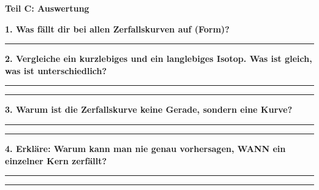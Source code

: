 \documentclass[10pt, a4paper]{article}
\newcommand{\fachfarbe}{physik}
\newcommand{\luecke}[1]{\rule{#1}{0.4pt}}
\newcommand{\abschnitt}[1]{%
    \vspace{8pt}\noindent\textbf{\textcolor{\fachfarbe}{#1}}\vspace{4pt}
}
\begin{document}
\vspace{12pt}

\abschnitt{Teil C: Auswertung}

\textbf{1. Was fällt dir bei allen Zerfallskurven auf (Form)?}

\vspace{4pt}
\luecke{14cm}

\vspace{8pt}

\textbf{2. Vergleiche ein kurzlebiges und ein langlebiges Isotop. Was ist gleich, was ist unterschiedlich?}

\vspace{4pt}
\luecke{14cm}

\vspace{4pt}
\luecke{14cm}

\vspace{8pt}

\textbf{3. Warum ist die Zerfallskurve keine Gerade, sondern eine Kurve?}

\vspace{4pt}
\luecke{14cm}

\vspace{4pt}
\luecke{14cm}

\vspace{8pt}

\textbf{4. Erkläre: Warum kann man nie genau vorhersagen, WANN ein einzelner Kern zerfällt?}

\vspace{4pt}
\luecke{14cm}

\vspace{4pt}
\luecke{14cm}
\end{document}
